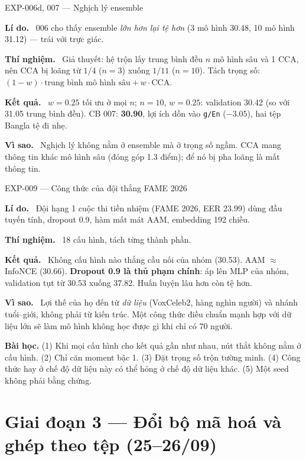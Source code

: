 \documentclass[11pt,a4paper,oneside]{report}
\newcommand{\up}[1]{\textbf{\color{good}#1}}
\newcommand{\down}[1]{\textbf{\color{bad}#1}}
\newcommand{\id}[1]{\texttt{#1}}
\newcommand{\field}[1]{\par\smallskip\textbf{\color{accent}#1.}~}
\begin{document}
\begin{expbox}{EXP-006d, 007 --- Nghịch lý ensemble}
\field{Lí do} 006 cho thấy ensemble \emph{lớn hơn lại tệ hơn} (3 mô hình 30.48, 10 mô hình 31.12) --- trái với trực giác.
\field{Thí nghiệm} Giả thuyết: hệ trộn lấy trung bình đều $n$ mô hình sâu và 1 CCA, nên CCA bị loãng từ $1/4$ ($n=3$) xuống $1/11$ ($n=10$). Tách trọng số: $(1-w)\cdot\text{trung bình mô hình sâu}+w\cdot\text{CCA}$.
\field{Kết quả} $w=0.25$ tối ưu ở mọi $n$; $n=10$, $w=0.25$: validation 30.42 (so với 31.05 trung bình đều). CB 007: \up{30.90}, lợi ích dồn vào \id{g/En} (\up{$-3.05$}), hai tệp Bangla tệ đi nhẹ.
\field{Vì sao} Nghịch lý không nằm ở ensemble mà ở trọng số ngầm. CCA mang thông tin khác mô hình sâu (đóng góp 1.3 điểm); để nó bị pha loãng là mất thông tin.
\end{expbox}

\begin{expbox}{EXP-009 --- Công thức của đội thắng FAME 2026}
\field{Lí do} Đội hạng 1 cuộc thi tiền nhiệm (FAME 2026, EER 23.99) dùng đầu tuyến tính, dropout 0.9, hàm mất mát AAM, embedding 192 chiều.
\field{Thí nghiệm} 18 cấu hình, tách từng thành phần.
\field{Kết quả} Không cấu hình nào thắng cầu nối của nhóm (30.53). AAM $\approx$ InfoNCE (30.66). \down{Dropout 0.9 là thủ phạm chính}: áp lên MLP của nhóm, validation tụt từ 30.53 xuống 37.82. Huấn luyện lâu hơn còn tệ hơn.
\field{Vì sao} Lợi thế của họ đến từ \emph{dữ liệu} (VoxCeleb2, hàng nghìn người) và nhánh tuổi--giới, không phải từ kiến trúc. Một công thức điều chuẩn mạnh hợp với dữ liệu lớn sẽ làm mô hình không học được gì khi chỉ có 70 người.
\end{expbox}

\begin{lesson}
\textbf{Bài học.} (1) Khi mọi cấu hình cho kết quả gần như nhau, nút thắt không nằm ở cấu hình. (2) Chỉ căn moment bậc 1. (3) Đặt trọng số trộn tường minh. (4) Công thức hay ở chế độ dữ liệu này có thể hỏng ở chế độ dữ liệu khác. (5) Một seed không phải bằng chứng.
\end{lesson}

\section{Giai đoạn 3 --- Đổi bộ mã hoá và ghép theo tệp (25--26/09)}
\label{sec:p3}
\end{document}

